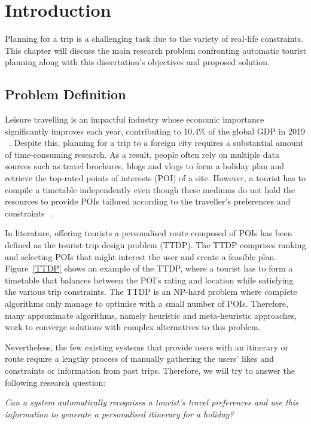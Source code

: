 \section{Introduction}
\label{Introduction}

Planning for a trip is a challenging task due to the
variety of real-life constraints. This chapter will
discuss the main research problem confronting
automatic tourist planning along with this
dissertation's objectives and proposed solution.

\subsection{Problem Definition}
Leisure travelling is an impactful industry
whose economic importance significantly improves each
year, contributing to 10.4\% of the global GDP in 2019
~\cite{wttc2018travel}. Despite this, planning for a trip to a
foreign city requires a substantial amount of
time-consuming research. As a result, people often
rely on multiple data sources such as travel
brochures, blogs and vlogs to form a holiday plan and
retrieve the top-rated points of interests (POI) of a site. 
However, a tourist has to compile a timetable
independently even though these mediums do not hold the
resources to provide POIs tailored according to the
traveller's preferences and constraints
~\cite{DeChoudhury2010}. 

In literature, offering tourists a personalised route
composed of POIs has been defined as the tourist trip
design problem (TTDP). The TTDP comprises ranking
and selecting POIs that might interest the user and
create a feasible plan. Figure~\ref{TTDP} shows an example
of the TTDP,  where a tourist has to form a timetable
that balances between the POI's rating and location
while satisfying the various trip constraints. 
The TTDP is an NP-hard problem where complete 
algorithms only manage to optimise with a small number
of POIs. Therefore, many approximate algorithms,
namely heuristic and meta-heuristic approaches, work
to converge solutions with complex alternatives to
this problem.

Nevertheless, the few existing systems that provide
users with an itinerary or route require a lengthy
process of manually gathering the users' likes and
constraints or information from past trips. Therefore, 
we will try to answer the following research question:


\begin{center}

    \textit{Can a system automatically recognises a tourist's travel
    preferences and use this information to generate a personalised itinerary
for a holiday?}

\end{center}


